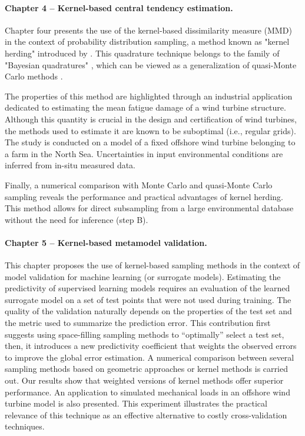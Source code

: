 \paragraph{Chapter 4 -- Kernel-based central tendency estimation.} 
Chapter four presents the use of the kernel-based dissimilarity measure (MMD) in the context of probability distribution sampling, a method known as "kernel herding" introduced by \citet{chen_welling_2010}. 
This quadrature technique belongs to the family of "Bayesian quadratures" \citet{briol_oates_2019}, which can be viewed as a generalization of quasi-Monte Carlo methods \citet{hickernell_2020}. 

The properties of this method are highlighted through an industrial application dedicated to estimating the mean fatigue damage of a wind turbine structure. 
Although this quantity is crucial in the design and certification of wind turbines, the methods used to estimate it are known to be suboptimal (i.e., regular grids). 
The study is conducted on a model of a fixed offshore wind turbine belonging to a farm in the North Sea. 
Uncertainties in input environmental conditions are inferred from in-situ measured data. 

Finally, a numerical comparison with Monte Carlo and quasi-Monte Carlo sampling reveals the performance and practical advantages of kernel herding. 
This method allows for direct subsampling from a large environmental database without the need for inference (step B).


\paragraph{Chapter 5 -- Kernel-based metamodel validation.} 
This chapter proposes the use of kernel-based sampling methods in the context of model validation for machine learning (or surrogate models). 
Estimating the predictivity of supervised learning models requires an evaluation of the learned surrogate model on a set of test points that were not used during training. 
The quality of the validation naturally depends on the properties of the test set and the metric used to summarize the prediction error. 
This contribution first suggests using space-filling sampling methods to ``optimally'' select a test set, then, 
it introduces a new predictivity coefficient that weights the observed errors to improve the global error estimation. 
A numerical comparison between several sampling methods based on geometric approaches \citep{shang_apley_2020} or kernel methods \cite{chen_welling_2010,mak_joseph_2018} is carried out. 
Our results show that weighted versions of kernel methods offer superior performance. 
An application to simulated mechanical loads in an offshore wind turbine model is also presented. 
This experiment illustrates the practical relevance of this technique as an effective alternative to costly cross-validation techniques.

